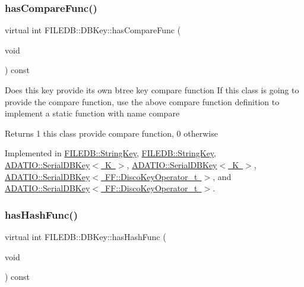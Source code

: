 \subsubsection{\texorpdfstring{hasCompareFunc()}{hasCompareFunc()}\hspace{0.1cm}{\footnotesize\ttfamily [2/2]}}
{\footnotesize\ttfamily virtual int F\+I\+L\+E\+D\+B\+::\+D\+B\+Key\+::has\+Compare\+Func (\begin{DoxyParamCaption}\item[{void}]{ }\end{DoxyParamCaption}) const\hspace{0.3cm}{\ttfamily [pure virtual]}}

Does this key provide its own btree key compare function If this class is going to provide the compare function, use the above compare function definition to implement a static function with name compare

\begin{DoxyReturn}{Returns}
1 this class provide compare function, 0 otherwise 
\end{DoxyReturn}


Implemented in \mbox{\hyperlink{classFILEDB_1_1StringKey_a430c4d6d22db7160c501c1703f9f13cf}{F\+I\+L\+E\+D\+B\+::\+String\+Key}}, \mbox{\hyperlink{classFILEDB_1_1StringKey_a430c4d6d22db7160c501c1703f9f13cf}{F\+I\+L\+E\+D\+B\+::\+String\+Key}}, \mbox{\hyperlink{classADATIO_1_1SerialDBKey_a2f28d2ac39919d9cb9f6fc097944c49c}{A\+D\+A\+T\+I\+O\+::\+Serial\+D\+B\+Key$<$ K $>$}}, \mbox{\hyperlink{classADATIO_1_1SerialDBKey_a2f28d2ac39919d9cb9f6fc097944c49c}{A\+D\+A\+T\+I\+O\+::\+Serial\+D\+B\+Key$<$ K $>$}}, \mbox{\hyperlink{classADATIO_1_1SerialDBKey_a2f28d2ac39919d9cb9f6fc097944c49c}{A\+D\+A\+T\+I\+O\+::\+Serial\+D\+B\+Key$<$ F\+F\+::\+Disco\+Key\+Operator\+\_\+t $>$}}, and \mbox{\hyperlink{classADATIO_1_1SerialDBKey_a2f28d2ac39919d9cb9f6fc097944c49c}{A\+D\+A\+T\+I\+O\+::\+Serial\+D\+B\+Key$<$ F\+F\+::\+Disco\+Key\+Operator\+\_\+t $>$}}.

\mbox{\label{classFILEDB_1_1DBKey_a541dab4f4083ae951dee2f30483eb18e}} 
\subsubsection{\texorpdfstring{hasHashFunc()}{hasHashFunc()}\hspace{0.1cm}{\footnotesize\ttfamily [1/2]}}
{\footnotesize\ttfamily virtual int F\+I\+L\+E\+D\+B\+::\+D\+B\+Key\+::has\+Hash\+Func (\begin{DoxyParamCaption}\item[{void}]{ }\end{DoxyParamCaption}) const\hspace{0.3cm}{\ttfamily [pure virtual]}}

